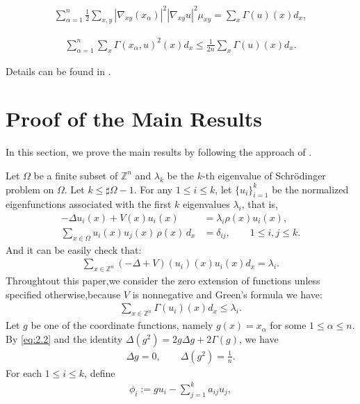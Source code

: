\documentclass[11pt]{article}
\theoremstyle{definition}
\theoremstyle{remark}
\numberwithin{equation}{section}
\begin{document}
 \begin{align}\label{eq:2.3}
  \sum_{\alpha = 1}^{n}\frac{1}{2}\sum_{x,y}{}|\nabla_{xy}(x_\alpha)|^2|\nabla_{xy}u|^2\mu_{xy}=\sum_{x}{}\Gamma(u)(x)d_x,\end{align}\par\noindent

 \begin{align}\label{eq:2.4}
  \sum_{\alpha=1}^{n}\sum_{x}{}\Gamma(x_\alpha,u)^2(x)d_x\le\frac{1}{2n}\sum_{x}{}\Gamma(u)(x)d_x.\end{align}\par
 Details can be found in \cite{hua2023payne}.
 \section{Proof of the Main Results}
\noindent
In this section, we prove the main results by following the approach of
\cite{ashbaugh2002universal,hua2023payne}.\par
Let $\Omega$ be a finite subset of $\mathbb{Z}^n$ and $\lambda_k$ be the $k$-th eigenvalue of Schrödinger problem on $\Omega$. 
Let $k \le \sharp\Omega -1.$ For any $1 \le i \le k$, let $\{u_i\}_{i=1}^k$ be the normalized eigenfunctions associated with the first
$k$ eigenvalues $\lambda_i$, that is,
\begin{align*}
-\Delta u_i(x) + V(x) u_i(x) &= \lambda_i \rho(x) u_i(x), \\
\sum_{x \in \Omega} u_i(x) u_j(x)\,\rho(x)\, d_x &= \delta_{ij},
\qquad 1 \le i,j \le k.
\end{align*}
And it can be easily check that:
\begin{align*}
\sum_{x\in \mathbb{Z}^n}(-\Delta+V)(u_i)(x)u_i(x)d_x=\lambda_i.
\end{align*}
Throughtout this paper,we consider the zero extension of functions unless specified otherwise,because $V$ is 
nonnegative and Green's formula we have:
\begin{align}\label{eq:3.1}
\sum_{x\in \mathbb{Z}^n}\Gamma(u_i)(x)d_x\le \lambda_i.
\end{align}
Let $g$ be one of the coordinate functions, namely $g(x) = x_\alpha$ for some
$1 \le \alpha \le n$. By \eqref{eq:2.2} and the identity
$\Delta(g^2) = 2 g \Delta g + 2 \Gamma(g)$, we have
\begin{align}
\Delta g = 0, \qquad \Delta(g^2) = \frac{1}{n}.
\end{align}
For each $1 \le i \le k$, define
\begin{align*}
\phi_i := g u_i - \sum_{j=1}^k a_{ij} u_j,
\end{align*}
\end{document}
